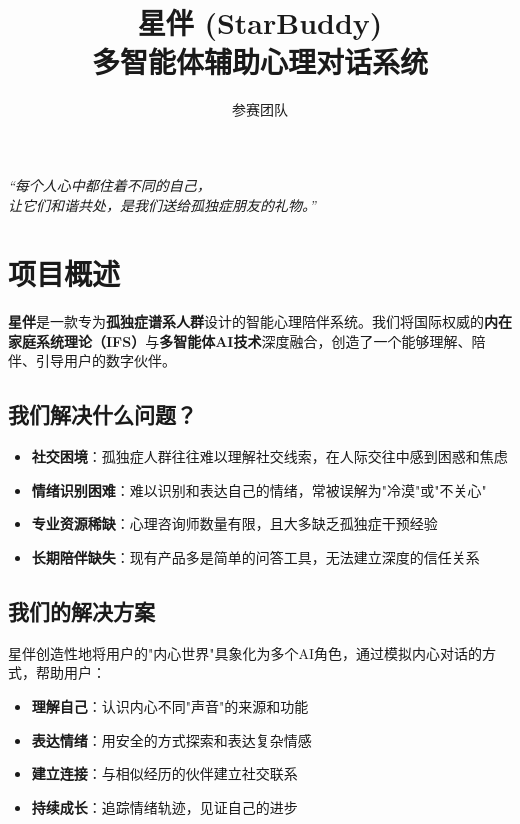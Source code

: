 \documentclass[12pt,a4paper]{article}
\title{\textbf{\Huge 星伴 (StarBuddy)}\\[0.5em]
\Large 多智能体辅助心理对话系统}
\author{参赛团队}
\date{}
\begin{document}
\maketitle

\begin{center}
\textit{``每个人心中都住着不同的自己，\\让它们和谐共处，是我们送给孤独症朋友的礼物。''}
\end{center}

\vspace{1em}

\section{项目概述}

\textbf{星伴}是一款专为\textbf{孤独症谱系人群}设计的智能心理陪伴系统。我们将国际权威的\textbf{内在家庭系统理论（IFS）}与\textbf{多智能体AI技术}深度融合，创造了一个能够理解、陪伴、引导用户的数字伙伴。

\subsection{我们解决什么问题？}

\begin{itemize}[leftmargin=*]
    \item \textbf{社交困境}：孤独症人群往往难以理解社交线索，在人际交往中感到困惑和焦虑
    \item \textbf{情绪识别困难}：难以识别和表达自己的情绪，常被误解为"冷漠"或"不关心"
    \item \textbf{专业资源稀缺}：心理咨询师数量有限，且大多缺乏孤独症干预经验
    \item \textbf{长期陪伴缺失}：现有产品多是简单的问答工具，无法建立深度的信任关系
\end{itemize}

\subsection{我们的解决方案}

星伴创造性地将用户的"内心世界"具象化为多个AI角色，通过模拟内心对话的方式，帮助用户：
\begin{itemize}[leftmargin=*]
    \item \textbf{理解自己}：认识内心不同"声音"的来源和功能
    \item \textbf{表达情绪}：用安全的方式探索和表达复杂情感
    \item \textbf{建立连接}：与相似经历的伙伴建立社交联系
    \item \textbf{持续成长}：追踪情绪轨迹，见证自己的进步
\end{itemize}
\end{document}
